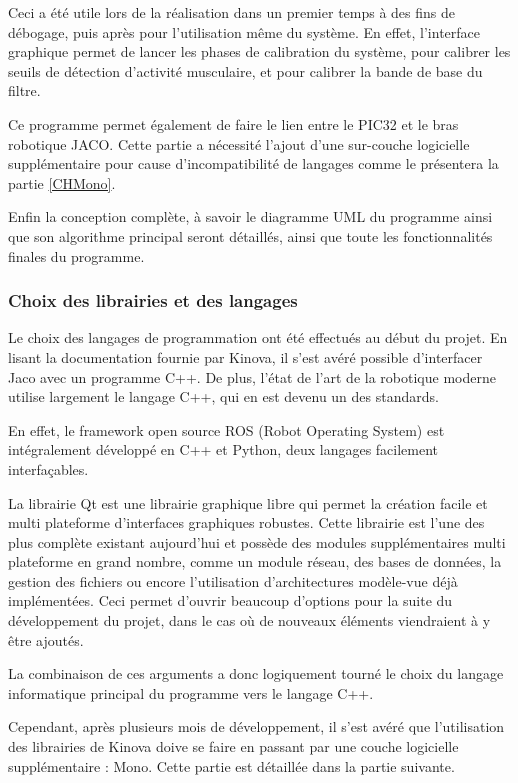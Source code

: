 \documentclass[letterpaper, twoside, 12pt, memoire, creativecommons, hyperref]{thETS}
\begin{document}
Ceci a été utile lors de la réalisation dans un premier temps à des fins de débogage, puis après pour l'utilisation même du système. En effet, l'interface graphique permet de lancer les phases de calibration du système, pour calibrer les seuils de détection d'activité musculaire, et pour calibrer la bande de base du filtre. 

Ce programme permet également de faire le lien entre le PIC32 et le bras robotique JACO. Cette partie a nécessité l'ajout d'une sur-couche logicielle supplémentaire pour cause d'incompatibilité de langages comme le présentera la partie \ref{CHMono}.

Enfin la conception complète, à savoir le diagramme UML du programme ainsi que son algorithme principal seront détaillés, ainsi que toute les fonctionnalités finales du programme.

\subsubsection{Choix des librairies et des langages}

Le choix des langages de programmation ont été effectués au début du projet. En lisant la documentation fournie par Kinova, il s'est avéré possible d'interfacer Jaco avec un programme C++. De plus, l'état de l'art de la robotique moderne utilise largement le langage C++, qui en est devenu un des standards. 

En effet, le framework open source ROS (Robot Operating System) est intégralement développé en C++ et Python, deux langages facilement interfaçables. 

La librairie Qt est une librairie graphique libre qui permet la création facile et multi plateforme d'interfaces graphiques robustes. Cette librairie est l'une des plus complète existant aujourd'hui et possède des modules supplémentaires multi plateforme en grand nombre, comme un module réseau, des bases de données, la gestion des fichiers ou encore l'utilisation d'architectures modèle-vue déjà implémentées. Ceci permet d'ouvrir beaucoup d'options pour la suite du développement du projet, dans le cas où de nouveaux éléments viendraient à y être ajoutés. 

La combinaison de ces arguments a donc logiquement tourné le choix du langage informatique principal du programme vers le langage C++.

Cependant, après plusieurs mois de développement, il s'est avéré que l'utilisation des librairies de Kinova doive se faire en passant par une couche logicielle supplémentaire : Mono. Cette partie est détaillée dans la partie suivante.
\end{document}
